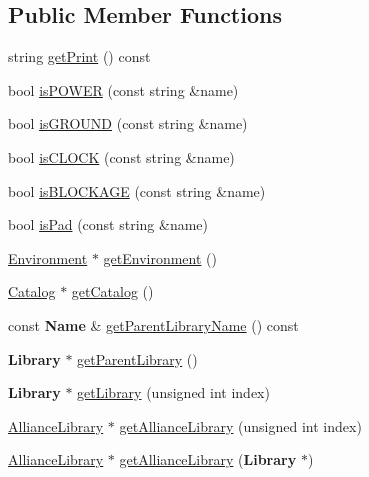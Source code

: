 \subsection*{Public Member Functions}
\begin{DoxyCompactItemize}
\item 
string \hyperlink{classCRL_1_1AllianceFramework_a5992ef0669bfdefc4d712db9369bfb81}{get\-Print} () const 
\item 
bool \hyperlink{classCRL_1_1AllianceFramework_adc7dc5aa7e84b1fd94bc4a29bc6260e1}{is\-P\-O\-W\-E\-R} (const string \&name)
\item 
bool \hyperlink{classCRL_1_1AllianceFramework_a0dcd1a667226f37353fdf0ea232d9c5d}{is\-G\-R\-O\-U\-N\-D} (const string \&name)
\item 
bool \hyperlink{classCRL_1_1AllianceFramework_a79ae573b6b685c1796e29ccc15c1c146}{is\-C\-L\-O\-C\-K} (const string \&name)
\item 
bool \hyperlink{classCRL_1_1AllianceFramework_aa41d24d292c19624236fff250a28b102}{is\-B\-L\-O\-C\-K\-A\-G\-E} (const string \&name)
\item 
bool \hyperlink{classCRL_1_1AllianceFramework_a0c48b5b15d769c6f17c4098dcaf46bcd}{is\-Pad} (const string \&name)
\item 
\hyperlink{classCRL_1_1Environment}{Environment} $\ast$ \hyperlink{classCRL_1_1AllianceFramework_a8e044592d2ceaea0060aec5dc5cc6900}{get\-Environment} ()
\item 
\hyperlink{classCRL_1_1Catalog}{Catalog} $\ast$ \hyperlink{classCRL_1_1AllianceFramework_a036bd6fa8f837c81f60b9d424f817add}{get\-Catalog} ()
\item 
const {\bf Name} \& \hyperlink{classCRL_1_1AllianceFramework_a9d2ad16894430081a00545d8fae952ed}{get\-Parent\-Library\-Name} () const 
\item 
{\bf Library} $\ast$ \hyperlink{classCRL_1_1AllianceFramework_afe822e9e04b613862aec5066743e1ffd}{get\-Parent\-Library} ()
\item 
{\bf Library} $\ast$ \hyperlink{classCRL_1_1AllianceFramework_ab6f9ac0f07b20c2444b13ef8bc55c9ea}{get\-Library} (unsigned int index)
\item 
\hyperlink{classCRL_1_1AllianceLibrary}{Alliance\-Library} $\ast$ \hyperlink{classCRL_1_1AllianceFramework_a4085f3bc96ca5e4bf2d41a4ada9658f2}{get\-Alliance\-Library} (unsigned int index)
\item 
\hyperlink{classCRL_1_1AllianceLibrary}{Alliance\-Library} $\ast$ \hyperlink{classCRL_1_1AllianceFramework_a8e007b3f2ac45feec2907f77530a718c}{get\-Alliance\-Library} ({\bf Library} $\ast$)

\end{DoxyCompactItemize}
